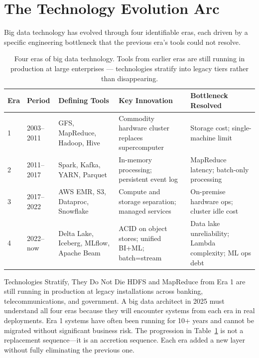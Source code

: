 \section{The Technology Evolution Arc}
\label{sec:evolution}

Big data technology has evolved through four identifiable eras, each
driven by a specific engineering bottleneck that the previous era's tools
could not resolve.

\begin{table}[htbp]
\centering
\renewcommand{\arraystretch}{1.5}
\begin{tabular}{p{1.2cm}p{1.8cm}p{3.0cm}p{3.0cm}p{2.6cm}}
  \toprule
  \textbf{Era} & \textbf{Period}
    & \textbf{Defining Tools} & \textbf{Key Innovation}
    & \textbf{Bottleneck Resolved} \\
  \midrule
  1 & 2003--2011
    & GFS, MapReduce, Hadoop, Hive
    & Commodity hardware cluster replaces supercomputer
    & Storage cost; single-machine limit \\
  2 & 2011--2017
    & Spark, Kafka, YARN, Parquet
    & In-memory processing; persistent event log
    & MapReduce latency; batch-only processing \\
  3 & 2017--2022
    & AWS EMR, S3, Dataproc, Snowflake
    & Compute and storage separation; managed services
    & On-premise hardware ops; cluster idle cost \\
  4 & 2022--now
    & Delta Lake, Iceberg, MLflow, Apache Beam
    & ACID on object stores; unified BI+ML; batch=stream
    & Data lake unreliability; Lambda complexity; ML ops debt \\
  \bottomrule
\end{tabular}
\caption{Four eras of big data technology. Tools from earlier eras are
         still running in production at large enterprises --- technologies
         stratify into legacy tiers rather than disappearing.}
\label{tab:eras}
\end{table}

\begin{keyinsight}{Technologies Stratify, They Do Not Die}
HDFS and MapReduce from Era 1 are still running in production at
legacy installations across banking, telecommunications, and government.
A big data architect in 2025 must understand all four eras because they
will encounter systems from each era in real deployments. Era 1 systems
have often been running for 10+ years and cannot be migrated without
significant business risk. The progression in Table~\ref{tab:eras} is
not a replacement sequence---it is an accretion sequence. Each era added
a new layer without fully eliminating the previous one.
\end{keyinsight}

